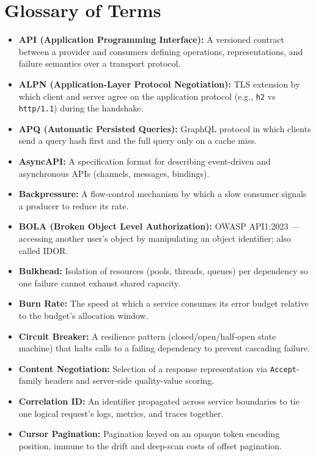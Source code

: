 \documentclass[12pt, a4paper, twoside, openright]{book}
\theoremstyle{definition}
\theoremstyle{remark}
\begin{document}
\section{Glossary of Terms}

\begin{itemize}
  \item \textbf{API (Application Programming Interface):} A versioned contract between a provider and consumers defining operations, representations, and failure semantics over a transport protocol.
  \item \textbf{ALPN (Application-Layer Protocol Negotiation):} TLS extension by which client and server agree on the application protocol (e.g., \texttt{h2} vs \texttt{http/1.1}) during the handshake.
  \item \textbf{APQ (Automatic Persisted Queries):} GraphQL protocol in which clients send a query hash first and the full query only on a cache miss.
  \item \textbf{AsyncAPI:} A specification format for describing event-driven and asynchronous APIs (channels, messages, bindings).
  \item \textbf{Backpressure:} A flow-control mechanism by which a slow consumer signals a producer to reduce its rate.
  \item \textbf{BOLA (Broken Object Level Authorization):} OWASP API1:2023 — accessing another user's object by manipulating an object identifier; also called IDOR.
  \item \textbf{Bulkhead:} Isolation of resources (pools, threads, queues) per dependency so one failure cannot exhaust shared capacity.
  \item \textbf{Burn Rate:} The speed at which a service consumes its error budget relative to the budget's allocation window.
  \item \textbf{Circuit Breaker:} A resilience pattern (closed/open/half-open state machine) that halts calls to a failing dependency to prevent cascading failure.
  \item \textbf{Content Negotiation:} Selection of a response representation via \texttt{Accept}-family headers and server-side quality-value scoring.
  \item \textbf{Correlation ID:} An identifier propagated across service boundaries to tie one logical request's logs, metrics, and traces together.
  \item \textbf{Cursor Pagination:} Pagination keyed on an opaque token encoding position, immune to the drift and deep-scan costs of offset pagination.

\end{itemize}
\end{document}
